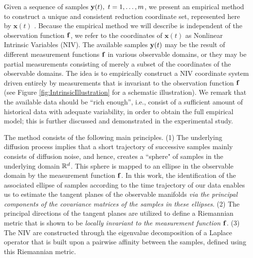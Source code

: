 Given a sequence of samples $\data(t), \ t=1,\ldots,\ndata$, we present an empirical method to construct a unique and consistent reduction coordinate set, represented here by $\mathbf{x}(t)$ \cite{singer2008non}.
%
Because the empirical method we will describe is independent of the observation function $\mathbf{f}$,
we refer to the coordinates of $\mathbf{x}(t)$ as Nonlinear Intrinsic Variables (NIV).
%
The available samples $\mathbf{y}(t)$ may be the result of different measurement functions $\mathbf{f}$ in various observable domains,
or they may be partial measurements consisting of merely a subset of the coordinates of the observable domains.
%
The idea is to empirically construct a NIV coordinate system driven entirely by measurements that is invariant to the observation function $\mathbf{f}$
(see Figure \ref{fig:IntrinsicIllustration} for a schematic illustration).
%
We remark that the available data should be ``rich enough'', i.e., consist of a sufficient amount of historical data with adequate variability, in order to obtain the full empirical model;
this is further discussed and demonstrated in the experimental study.

The method consists of the following main principles.
%
(1) The underlying diffusion process implies that a short trajectory of successive samples mainly consists of diffusion noise,
and hence, creates a ``sphere" of samples in the underlying domain $\mathbb{R}^d$.
%
This sphere is mapped to an ellipse in the observable domain by the measurement function $\mathbf{f}$.
%
In this work, the identification of the associated ellipse of samples according to the time trajectory of our data enables us
to estimate the tangent planes of the observable manifolds {\em via the principal components of the covariance matrices of the samples in these ellipses}.
%
(2) The principal directions of the tangent planes are utilized to define a Riemannian metric that is shown to be {\em locally invariant to the measurement function $\mathbf{f}$}.
%
(3) The NIV are constructed through the eigenvalue decomposition of a Laplace operator that is built upon a pairwise affinity between the samples, defined using this Riemannian metric.

